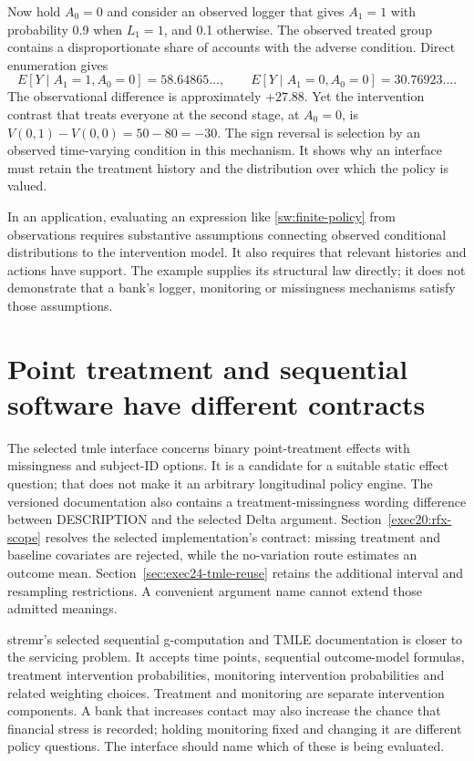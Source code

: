 Now hold \(A_0=0\) and consider an observed logger that gives \(A_1=1\) with
probability 0.9 when \(L_1=1\), and 0.1 otherwise. The observed treated group
contains a disproportionate share of accounts with the adverse condition.
Direct enumeration gives
\[
 E[Y\mid A_1=1,A_0=0]=58.64865\ldots,
 \qquad E[Y\mid A_1=0,A_0=0]=30.76923\ldots.
\]
The observational difference is approximately \(+27.88\). Yet the intervention
contrast that treats everyone at the second stage, at \(A_0=0\), is
\(V(0,1)-V(0,0)=50-80=-30\). The sign reversal is selection by an observed
time-varying condition in this mechanism. It shows why an interface must retain
the treatment history and the distribution over which the policy is valued.

In an application, evaluating an expression like
\eqref{sw:finite-policy} from observations requires substantive assumptions
connecting observed conditional distributions to the intervention model. It
also requires that relevant histories and actions have support. The example
supplies its structural law directly; it does not demonstrate that a bank's
logger, monitoring or missingness mechanisms satisfy those assumptions.

\section{Point treatment and sequential software have different contracts}

The selected tmle interface concerns binary point-treatment effects with
missingness and subject-ID options. It is a candidate for a suitable static
effect question; that does not make it an arbitrary longitudinal policy engine.
The versioned documentation also contains a treatment-missingness wording
difference between DESCRIPTION and the selected Delta argument.
Section~\ref{exec20:rfx-scope} resolves the selected implementation's contract:
missing treatment and baseline covariates are rejected, while the no-variation
route estimates an outcome mean. Section~\ref{sec:exec24-tmle-reuse} retains
the additional interval and resampling restrictions. A convenient argument
name cannot extend those admitted meanings. \cite{v12_sw_tmle}

stremr's selected sequential g-computation and TMLE documentation is closer to
the servicing problem. It accepts time points, sequential outcome-model
formulas, treatment intervention probabilities, monitoring intervention
probabilities and related weighting choices. Treatment and monitoring are
separate intervention components. A bank that increases contact may also
increase the chance that financial stress is recorded; holding monitoring
fixed and changing it are different policy questions. The interface should
name which of these is being evaluated. \cite{v12_sw_stremr}

